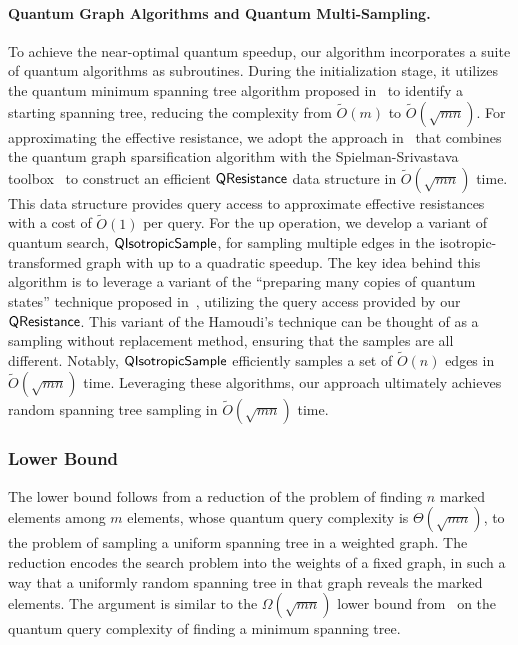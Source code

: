 \documentclass[11pt]{article}
\begin{document}
{\paragraph{Quantum Graph Algorithms and Quantum Multi-Sampling.} 
To achieve the near-optimal quantum speedup, our algorithm incorporates a suite
of quantum algorithms as subroutines.
During the initialization stage, it utilizes the quantum minimum spanning tree
algorithm proposed in~\cite{DHHM06} to identify a starting spanning tree,
reducing the complexity from $\widetilde{O}(m)$ to $\widetilde{O}(\sqrt{mn})$.
For approximating the effective resistance, we adopt the approach
in~\cite{AdW22} that combines the quantum graph sparsification algorithm with
the Spielman-Srivastava toolbox~\cite{SS11} to construct an efficient
$\mathsf{QResistance}$ data structure in $\widetilde{O}(\sqrt{mn})$ time.
This data structure provides query access to approximate effective resistances
with a cost of $\widetilde{O}(1)$ per query.
For the up operation, we develop a variant of quantum search,
$\mathsf{QIsotropicSample}$, for sampling multiple edges in the isotropic-transformed
graph with up to a quadratic speedup.
The key idea behind this algorithm is to leverage a variant of the ``preparing
many copies of quantum states'' technique proposed in~\cite{Ham22}, utilizing
the query access provided by our $\mathsf{QResistance}$.
This variant of the Hamoudi's technique can be thought of as a sampling without
replacement method, ensuring that the samples are all different.
Notably, $\mathsf{QIsotropicSample}$ efficiently samples a set of $\widetilde O(n)$
edges in $\widetilde{O}(\sqrt{mn})$ time.
Leveraging these algorithms, our approach ultimately achieves random spanning
tree sampling in $\widetilde{O}(\sqrt{mn})$ time.


\subsubsection{Lower Bound}
The lower bound follows from a reduction of the problem of finding $n$ marked elements among $m$ elements, whose quantum query complexity is $\Theta(\sqrt{mn})$, to the problem of sampling a uniform spanning tree in a weighted graph.
The reduction encodes the search problem into the weights of a fixed graph, in such a way that a uniformly random spanning tree in that graph reveals the marked elements.
The argument is similar to the $\Omega(\sqrt{mn})$ lower bound from~\cite{DHHM06} on the quantum query complexity of finding a minimum spanning tree.

}
\end{document}
